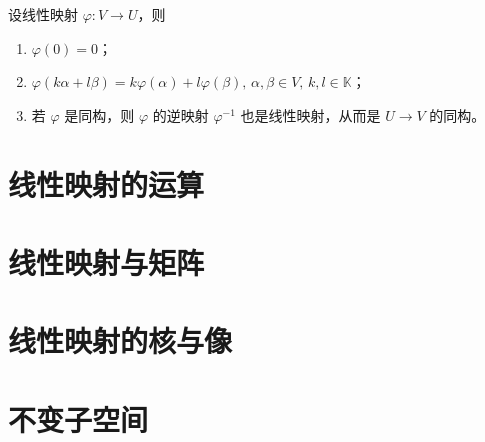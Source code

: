 \hfill

\begin{proposition}
    设线性映射 $\varphi : V \to U$，则
    \begin{enumerate}
        \item $\varphi(0) = 0$；
        \item $\varphi(k\alpha + l\beta) = k\varphi(\alpha) + l\varphi(\beta),\, \alpha,\beta \in V,\, k,l \in \mathbb{K}$；
        \item 若 $\varphi$ 是同构，则 $\varphi$ 的逆映射 $\varphi^{-1}$ 也是线性映射，从而是 $U \to V$ 的同构。
    \end{enumerate}
\end{proposition}




\section{线性映射的运算}







\section{线性映射与矩阵}







\section{线性映射的核与像}







\section{不变子空间}







\section{}






